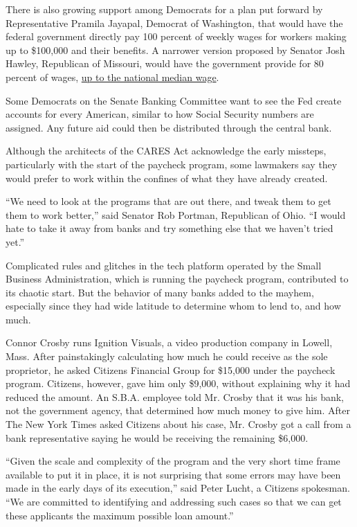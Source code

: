 There is also growing support among Democrats for a plan put forward by
Representative Pramila Jayapal, Democrat of Washington, that would have
the federal government directly pay 100 percent of weekly wages for
workers making up to \$100,000 and their benefits. A narrower version
proposed by Senator Josh Hawley, Republican of Missouri, would have the
government provide for 80 percent of wages,
\href{https://www.hawley.senate.gov/getting-america-back-work}{up to the
national median wage}.

Some Democrats on the Senate Banking Committee want to see the Fed
create accounts for every American, similar to how Social Security
numbers are assigned. Any future aid could then be distributed through
the central bank.

Although the architects of the CARES Act acknowledge the early missteps,
particularly with the start of the paycheck program, some lawmakers say
they would prefer to work within the confines of what they have already
created.

``We need to look at the programs that are out there, and tweak them to
get them to work better,'' said Senator Rob Portman, Republican of Ohio.
``I would hate to take it away from banks and try something else that we
haven't tried yet.''

Complicated rules and glitches in the tech platform operated by the
Small Business Administration, which is running the paycheck program,
contributed to its chaotic start. But the behavior of many banks added
to the mayhem, especially since they had wide latitude to determine whom
to lend to, and how much.

Connor Crosby runs Ignition Visuals, a video production company in
Lowell, Mass. After painstakingly calculating how much he could receive
as the sole proprietor, he asked Citizens Financial Group for \$15,000
under the paycheck program. Citizens, however, gave him only \$9,000,
without explaining why it had reduced the amount. An S.B.A. employee
told Mr. Crosby that it was his bank, not the government agency, that
determined how much money to give him. After The New York Times asked
Citizens about his case, Mr. Crosby got a call from a bank
representative saying he would be receiving the remaining \$6,000.

``Given the scale and complexity of the program and the very short time
frame available to put it in place, it is not surprising that some
errors may have been made in the early days of its execution,'' said
Peter Lucht, a Citizens spokesman. ``We are committed to identifying and
addressing such cases so that we can get these applicants the maximum
possible loan amount.''

